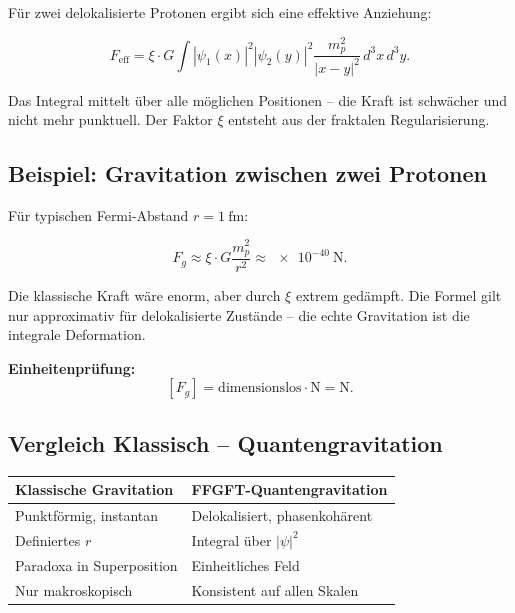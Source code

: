 	Für zwei delokalisierte Protonen ergibt sich eine effektive Anziehung:
	
	\begin{equation}
		F_{\text{eff}} = \xi \cdot G \int |\psi_1(x)|^2 |\psi_2(y)|^2 \frac{m_p^2}{|x-y|^2} \, d^3x \, d^3y.
	\end{equation}
	
	Das Integral mittelt über alle möglichen Positionen – die Kraft ist schwächer und nicht mehr punktuell. Der Faktor \(\xi\) entsteht aus der fraktalen Regularisierung.
	
	\subsection*{Beispiel: Gravitation zwischen zwei Protonen}
	
	Für typischen Fermi-Abstand \(r = \SI{1}{\femto\meter}\):
	
	\begin{equation}
		F_g \approx \xi \cdot G \frac{m_p^2}{r^2} \approx \SI{e-40}{\newton}.
	\end{equation}
	
	Die klassische Kraft wäre enorm, aber durch \(\xi\) extrem gedämpft. Die Formel gilt nur approximativ für delokalisierte Zustände – die echte Gravitation ist die integrale Deformation.
	
	\textbf{Einheitenprüfung:}
	\[
	[F_g] = \text{dimensionslos} \cdot \si{\newton} = \si{\newton}.
	\]
	
	\subsection*{Vergleich Klassisch – Quantengravitation}
	
	\begin{center}
		\begin{tabular}{p{}p{}}
			\textbf{Klassische Gravitation} & \textbf{FFGFT-Quantengravitation} \\
			\hline
			Punktförmig, instantan & Delokalisiert, phasenkohärent \\
			Definiertes $r$ & Integral über $|\psi|^2$ \\
			Paradoxa in Superposition & Einheitliches Feld \\
			Nur makroskopisch & Konsistent auf allen Skalen \\
		\end{tabular}
	\end{center}
	
